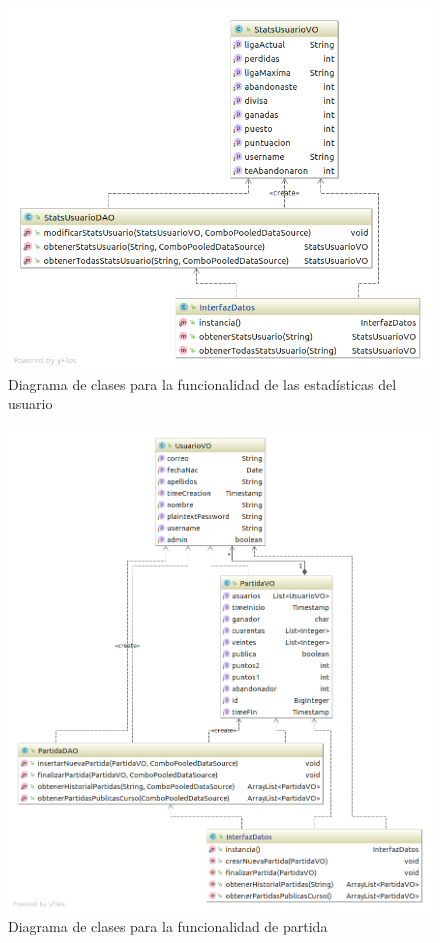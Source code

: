 \documentclass[]{article}
\begin{document}
\begin{figure}[H]
\centering
\includegraphics[scale = 0.5]{figuras/base_datos/clasesStats.png}
\caption{Diagrama de clases para la funcionalidad de las estadísticas del usuario}
\label{fig:diagramaClasesStats}
\end{figure}
\begin{figure}[H]
\centering
\includegraphics[scale = 0.5]{figuras/base_datos/clasesPartida.png}
\caption{Diagrama de clases para la funcionalidad de partida}
\label{fig:diagramaClasesPartida}
\end{figure}
\end{document}
